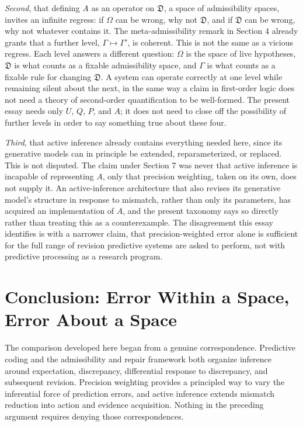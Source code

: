 \documentclass[11pt]{article}
\begin{document}
\textit{Second}, that defining $A$ as an operator on $\mathfrak{D}$, a space of admissibility spaces, invites an infinite regress: if $\Omega$ can be wrong, why not $\mathfrak{D}$, and if $\mathfrak{D}$ can be wrong, why not whatever contains it. The meta-admissibility remark in Section 4 already grants that a further level, $\Gamma \mapsto \Gamma'$, is coherent. This is not the same as a vicious regress. Each level answers a different question: $\Omega$ is the space of live hypotheses, $\mathfrak{D}$ is what counts as a fixable admissibility space, and $\Gamma$ is what counts as a fixable rule for changing $\mathfrak{D}$. A system can operate correctly at one level while remaining silent about the next, in the same way a claim in first-order logic does not need a theory of second-order quantification to be well-formed. The present essay needs only $U$, $Q$, $P$, and $A$; it does not need to close off the possibility of further levels in order to say something true about these four.

\textit{Third}, that active inference already contains everything needed here, since its generative models can in principle be extended, reparameterized, or replaced. This is not disputed. The claim under Section 7 was never that active inference is incapable of representing $A$, only that precision weighting, taken on its own, does not supply it. An active-inference architecture that also revises its generative model's structure in response to mismatch, rather than only its parameters, has acquired an implementation of $A$, and the present taxonomy says so directly rather than treating this as a counterexample. The disagreement this essay identifies is with a narrower claim, that precision-weighted error alone is sufficient for the full range of revision predictive systems are asked to perform, not with predictive processing as a research program.

\section{Conclusion: Error Within a Space, Error About a Space}

The comparison developed here began from a genuine correspondence. Predictive coding and the admissibility and repair framework both organize inference around expectation, discrepancy, differential response to discrepancy, and subsequent revision. Precision weighting provides a principled way to vary the inferential force of prediction errors, and active inference extends mismatch reduction into action and evidence acquisition. Nothing in the preceding argument requires denying those correspondences.
\end{document}
